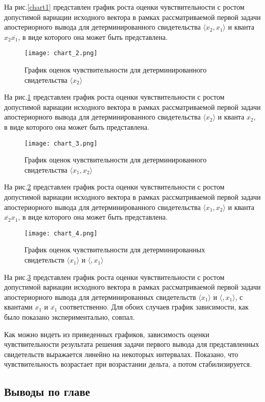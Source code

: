 На рис.\ref{chart1} представлен график роста оценки чувствительности с ростом допустимой вариации исходного вектора в рамках рассматриваемой первой задачи апостериорного вывода для детерминированного свидетельства $\langle x_{2}, x_{1} \rangle$ и кванта $x_{2} \overline{x_{1}}$, в виде которого она может быть представлена.

\begin{figure}[htbp]
\centerline{\texttt{[image: chart\_2.png]}}
\caption{График оценок чувствительности для детерминированного свидетельства  $\langle x_{2} \rangle$}
\label{chart2}
\end{figure}

На рис.\ref{chart2} представлен график роста оценки чувствительности с ростом допустимой вариации исходного вектора в рамках рассматриваемой первой задачи апостериорного вывода для детерминированного свидетельства $\langle x_{2}\rangle$ и кванта $x_{2}$, в виде которого она может быть представлена.

\begin{figure}[htbp]
\centerline{\texttt{[image: chart\_3.png]}}
\caption{График оценок чувствительности для детерминированного свидетельства  $\langle x_{1}, x_{2} \rangle$}
\label{chart3}
\end{figure}

На рис.\ref{chart3} представлен график роста оценки чувствительности с ростом допустимой вариации исходного вектора в рамках рассматриваемой первой задачи апостериорного вывода для детерминированного свидетельства $\langle x_{1}, x_{2} \rangle$ и кванта $\overline{x_{2}} x_{1}$, в виде которого она может быть представлена.

\begin{figure}[htbp]
\centerline{\texttt{[image: chart\_4.png]}}
\caption{График оценок чувствительности для детерминированных свидетельств  $\langle  x_{1} \rangle$ и $\langle , x_{1} \rangle$}
\label{chart4}
\end{figure}

На рис.\ref{chart4} представлен график роста оценки чувствительности с ростом допустимой вариации исходного вектора в рамках рассматриваемой первой задачи апостериорного вывода для детерминированных свидетельств $\langle x_{1} \rangle$ и $\langle , x_{1} \rangle$, с квантами $x_{1}$ и $\overline{x_{1}}$ соответственно. Для обоих случаев график зависимости, как было показано экспериментально, совпал.

Как можно видеть из приведенных графиков, зависимость оценки чувствительности результата решения задачи первого вывода для представленных свидетельств выражается линейно на некоторых интервалах. Показано, что чувствительность возрастает при возрастании дельта, а потом стабилизируется.

    
\subsection{Выводы по главе}